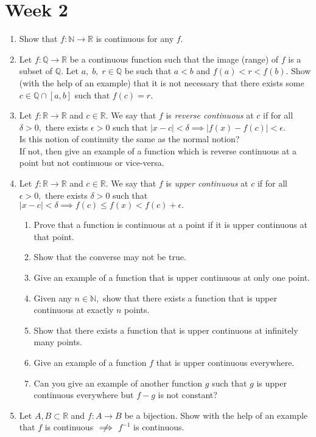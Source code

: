 \documentclass{article}
\begin{document}
\section{Week 2}
\begin{enumerate}
	\item Show that $f:\mathbb{N}\to\mathbb{R}$ is continuous for any $f.$
	\item Let $f:\mathbb{Q} \to \mathbb{R}$ be a continuous function such that the image (range) of $f$ is a subset of $\mathbb{Q}.$ Let $a,\;b,\;r\in \mathbb{Q}$ be such that $a < b$ and $f(a) < r < f(b).$ Show (with the help of an example) that it is not necessary that there exists some $c \in \mathbb{Q}\cap[a, b]$ such that $f(c) = r.$
	\item Let $f:\mathbb{R} \to \mathbb{R}$ and $c\in\mathbb{R}.$ We say that $f$ is \emph{reverse continuous} at $c$ if for all $\delta > 0,$ there exists $\epsilon > 0$ such that $|x - c| < \delta \implies |f(x) - f(c)| < \epsilon.$\\
	Is this notion of continuity the same as the normal notion?\\
	If not, then give an example of a function which is reverse continuous at a point but not continuous or vice-versa.
	\item  Let $f:\mathbb{R} \to \mathbb{R}$ and $c\in\mathbb{R}.$ We say that $f$ is \emph{upper continuous} at $c$ if for all $\epsilon > 0,$ there exists $\delta > 0$ such that $|x - c| < \delta \implies f(c) \le f(x) < f(c) + \epsilon.$
	\begin{enumerate} 
		\item Prove that a function is continuous at a point if it is upper continuous at that point.
		\item Show that the converse may not be true.
		\item Give an example of a function that is upper continuous at only one point.
		\item Given any $n \in \mathbb{N},$ show that there exists a function that is upper continuous at exactly $n$ points.
		\item Show that there exists a function that is upper continuous at infinitely many points.
		\item Give an example of a function $f$ that is upper continuous everywhere.
		\item Can you give an example of another function $g$ such that $g$ is upper continuous everywhere but $f-g$ is not constant?
	\end{enumerate}
	\item Let $A, B \subset \mathbb{R}$ and $f:A\to B$ be a bijection. Show with the help of an example that $f$ is continuous $\centernot\implies$ $f^{-1}$ is continuous. 

\end{enumerate}
\end{document}
